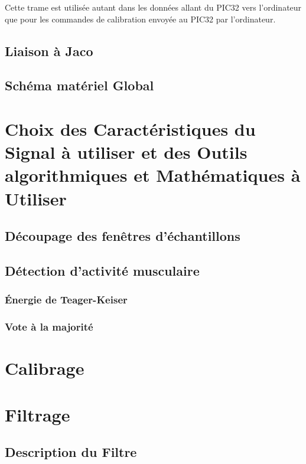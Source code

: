 \documentclass[letterpaper, twoside, 12pt, memoire, creativecommons, hyperref]{thETS}
\begin{document}
Cette trame est utilisée autant dans les données allant du PIC32 vers l'ordinateur que pour les commandes de calibration envoyée au PIC32 par l'ordinateur.

\subsection{Liaison à Jaco}

\subsection{Schéma matériel Global}

\section{Choix des Caractéristiques du Signal à utiliser et des Outils algorithmiques et Mathématiques à Utiliser}

\subsection{Découpage des fenêtres d'échantillons}

\subsection{Détection d'activité musculaire}

\subsubsection{Énergie de Teager-Keiser}

\subsubsection{Vote à la majorité}

\section{Calibrage}

\section{Filtrage}

\subsection{Description du Filtre}
\end{document}
